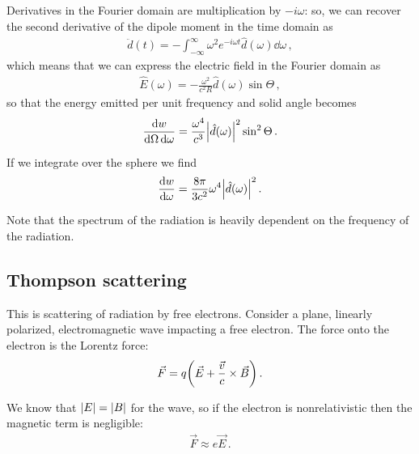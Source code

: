 \documentclass[main.tex]{subfiles}
\begin{document}
Derivatives in the Fourier domain are multiplication by \(-i \omega \): so, we can recover the second derivative of the dipole moment in the time domain as 
%
\begin{align}
\ddot{d} (t) = - \int_{- \infty }^{\infty } \omega^2 e^{-i \omega t} \hat{d}(\omega ) \dd{\omega }
\,,
\end{align}
%
which means that we can express the electric field in the Fourier domain as 
%
\begin{align}
\hat{E} ( \omega ) = - \frac{\omega^2}{c^2 R} \hat{d}(\omega ) \sin \Theta 
\,,
\end{align}
%
so that the energy emitted per unit frequency and solid angle becomes 
%
\begin{align}
\frac{ \dd{w}}{ \dd{\Omega } \dd{\omega }}  = \frac{\omega^{4}}{c^3} \abs{\hat{d}(\omega  )}^2 \sin^2 \Theta 
\,.
\end{align}

If we integrate over the sphere we find 
%
\begin{align} \label{eq:spectral-distribution-dipole}
\dv{w}{\omega } = \frac{8 \pi }{3 c^2} \omega^{4} \abs{\hat{d}(\omega )}^2
\,.
\end{align}

Note that the spectrum of the radiation is heavily dependent on the frequency of the radiation. 

\subsection{Thompson scattering}

This is scattering of radiation by free electrons. 
Consider a plane, linearly polarized, electromagnetic wave impacting a free electron. The force onto the electron is the Lorentz force: 
%
\begin{align}
\vec{F} = q \qty(\vec{E} + \frac{\vec{v}}{c} \times \vec{B})
\,.
\end{align}

We know that \(\abs{E} = \abs{B}\) for the wave, so if the electron is nonrelativistic then the magnetic term is negligible: 
%
\begin{align}
\vec{F} \approx e \vec{E}
\,.
\end{align}
\end{document}
